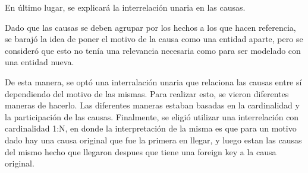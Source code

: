 \bigskip

En último lugar, se explicará la interrelación unaria en las causas. 

Dado que las causas se deben agrupar por los hechos a los que hacen referencia, se barajó la idea de poner el motivo de la causa como una entidad aparte, pero se consideró que esto no tenía una relevancia necesaria como para ser modelado con una entidad nueva. 

De esta manera, se optó una interralación unaria que relaciona las causas entre sí dependiendo del motivo de las mismas. Para realizar esto, se vieron diferentes maneras de hacerlo. Las diferentes maneras estaban basadas en la cardinalidad y la participación de las causas. Finalmente, se eligió utilizar una interrelación con cardinalidad 1:N, en donde la interpretación de la misma es que para un motivo dado hay una causa original que fue la primera en llegar, y luego estan las causas del mismo hecho que llegaron despues que tiene una foreign key a la causa original.

